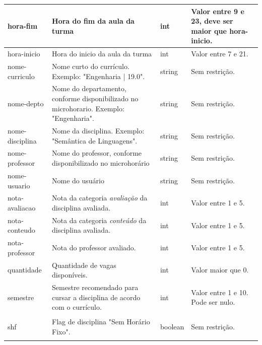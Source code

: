 \begin{longtable}{ | >{\raggedright}m{} | >{\raggedright}m{} | >{\raggedright}m{} | >{\raggedright}m{} | }
    hora-fim & Hora do fim da aula da turma & int & Valor entre 9 e 23, deve ser maior que hora-inicio.\tabularnewline\hline
    hora-inicio & Hora do inicio da aula da turma & int & Valor entre 7 e 21.\tabularnewline\hline
    nome-curriculo & Nome curto do currículo. Exemplo: "Engenharia | 19.0". & string & Sem restrição.\tabularnewline\hline
    nome-depto & Nome do departamento, conforme disponibilizado no microhorario. Exemplo: "Engenharia". & string & Sem restrição.\tabularnewline\hline
    nome-disciplina & Nome da disciplina. Exemplo: "Semântica de Linguagens". & string & Sem restrição.\tabularnewline\hline
    nome-professor & Nome do professor, conforme disponibilizado no microhorário & string & Sem restrição.\tabularnewline\hline
    nome-usuario & Nome do usuário & string & Sem restrição.\tabularnewline\hline
    nota-avaliacao & Nota da categoria \textit{avaliação} da disciplina avaliada. & int & Valor entre 1 e 5.\tabularnewline\hline
    nota-conteudo & Nota da categoria \textit{conteúdo} da disciplina avaliada. & int & Valor entre 1 e 5.\tabularnewline\hline
    nota-professor & Nota do professor avaliado. & int & Valor entre 1 e 5.\tabularnewline\hline
    quantidade & Quantidade de vagas disponíveis. & int & Valor maior que 0.\tabularnewline\hline
    semestre & Semestre recomendado para cursar a disciplina de acordo com o currículo. & int & Valor entre 1 e 10. Pode ser nulo.\tabularnewline\hline
    shf & Flag de disciplina "Sem Horário Fixo". & boolean & Sem restrição.

    \label{tab:dicionario-dados}
\end{longtable}
